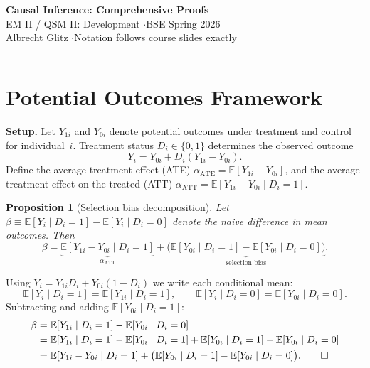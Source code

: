 \documentclass[12pt,a4paper]{article}
\theoremstyle{plain}
\newtheorem{propositio}{Proposition}[section]
\theoremstyle{definition}
\renewenvironment{proof}{\pushQED{\qed}\normalfont}{\popQED\par\nobreak}
\newcommand{\E}{\mathbb{E}}
\newcommand{\ATT}{\alpha_{\mathrm{ATT}}}
\newcommand{\ATE}{\alpha_{\mathrm{ATE}}}
\begin{document}
\begin{center}
  {\LARGE\bfseries Causal Inference: Comprehensive Proofs}\\[6pt]
  {\large EM II / QSM II: Development \quad$\cdot$\quad BSE Spring 2026}\\[4pt]
  {\normalsize Albrecht Glitz \quad$\cdot$\quad Notation follows course slides exactly}
\end{center}

\vspace{2pt}
\hrule
\vspace{10pt}

\tableofcontents

\newpage

\section{Potential Outcomes Framework}

\noindent\textbf{Setup.}
Let $Y_{1i}$ and $Y_{0i}$ denote potential outcomes under treatment and control for individual~$i$.
Treatment status $D_i\in\{0,1\}$ determines the observed outcome
\[
  Y_i = Y_{0i} + D_i(Y_{1i}-Y_{0i}).
\]
Define the average treatment effect (ATE) $\ATE = \E[Y_{1i}-Y_{0i}]$, and the average treatment effect on the treated (ATT) $\ATT = \E[Y_{1i}-Y_{0i}\mid D_i=1]$.

\begin{propositio}[Selection bias decomposition\label{prop:selectionbias}]
Let $\beta \equiv \E[Y_i\mid D_i=1]-\E[Y_i\mid D_i=0]$ denote the naive difference in mean outcomes.
Then
\[
  \beta = \underbrace{\E[Y_{1i}-Y_{0i}\mid D_i=1]}_{\ATT}
          + \underbrace{\bigl(\E[Y_{0i}\mid D_i=1]-\E[Y_{0i}\mid D_i=0]\bigr)}_{\text{selection bias}}.
\]
\end{propositio}

\begin{proof}
Using $Y_i = Y_{1i}D_i + Y_{0i}(1-D_i)$ we write each conditional mean:
\[
  \E[Y_i\mid D_i=1] = \E[Y_{1i}\mid D_i=1], \qquad
  \E[Y_i\mid D_i=0] = \E[Y_{0i}\mid D_i=0].
\]
Subtracting and adding $\E[Y_{0i}\mid D_i=1]$:
\begin{align*}
  \beta &= \E[Y_{1i}\mid D_i=1] - \E[Y_{0i}\mid D_i=0]\\
        &= \E[Y_{1i}\mid D_i=1] - \E[Y_{0i}\mid D_i=1]
           + \E[Y_{0i}\mid D_i=1] - \E[Y_{0i}\mid D_i=0]\\
        &= \E[Y_{1i}-Y_{0i}\mid D_i=1]
           + \bigl(\E[Y_{0i}\mid D_i=1]-\E[Y_{0i}\mid D_i=0]\bigr). \qedhere
\end{align*}
\end{proof}
\end{document}
